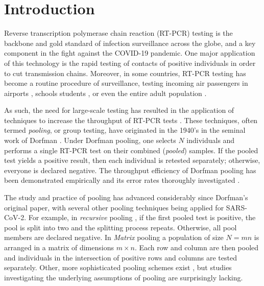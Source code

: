 \documentclass{article}
\begin{document}
\section*{Introduction}
Reverse transcription polymerase chain reaction (RT-PCR) testing is
the backbone and gold standard of infection surveillance across the
globe, and a key component in the fight against the COVID-19
pandemic. One major application of this technology is the rapid
testing of contacts of positive individuals in order to cut
transmission chains. Moreover, in some countries, RT-PCR testing has
become a routine procedure of surveillance, testing incoming air
passengers in airports \cite{PoolingAirports, TestingAirportsJapan},
schools students \cite{PoolSchool}, or even the entire adult
population \cite{MassPooling}.

As such, the need for large-scale testing has resulted in the
application of techniques to increase the throughput of RT-PCR tests
\cite{DorfmanYuvalDor, PoolSize30, BayesianDorfman, MatrixPooling,
  LionDorfman, CherifReview}. These techniques, often termed
\emph{pooling}, or group testing, have originated in the 1940's in the
seminal work of Dorfman \cite{DorfmanOriginal, DorfmanYuvalDor}. Under
Dorfman pooling, one selects $N$ individuals and performs a single
RT-PCR test on their combined (\emph{pooled}) samples. If the pooled
test yields a positive result, then each individual is retested
separately; otherwise, everyone is declared negative. The throughput
efficiency of Dorfman pooling has been demonstrated empirically
\cite{DorfmanYuvalDor} and its error rates thoroughly investigated
\cite{Kim, Simplistic1, OptimalDorfmanPool}.
  
The study and practice of pooling has advanced considerably since
Dorfman's original paper, with several other pooling techniques being
applied for SARS-CoV-2. For example, in \emph{recursive} pooling
\cite{Kim,RecursiveSevenFold}, if the first pooled test is positive,
the pool is split into two and the splitting process
repeats. Otherwise, all pool members are declared negative.  In
\emph{Matrix} pooling \cite{MatrixPooling} a population of size $N=mn$
is arranged in a matrix of dimensions $m\times n$. Each row and column
are then pooled and individuals in the intersection of positive rows
and columns are tested separately. Other, more sophisticated pooling
schemes exist \cite{CompressedPooling}, but studies investigating the
underlying assumptions of pooling are surprisingly lacking.
\end{document}
